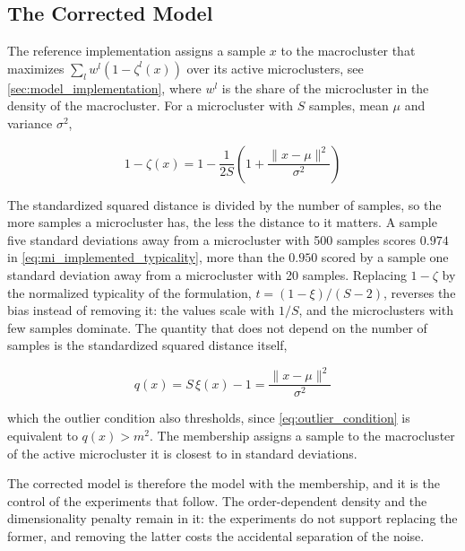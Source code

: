 \subsection{The Corrected Model}
\label{subsec:mi_corrected_model}

The reference implementation assigns a sample $x$ to the macrocluster that maximizes $\sum_{l} w^l \left(1 - \zeta^l(x)\right)$ over its active microclusters, see \cref{sec:model_implementation}, where $w^l$ is the share of the microcluster in the density of the macrocluster. For a microcluster with $S$ samples, mean $\mu$ and variance $\sigma^2$,

\begin{equation}
    1 - \zeta(x) = 1 - \frac{1}{2S} \left( 1 + \frac{\lVert x - \mu \rVert^2}{\sigma^2} \right)
    \label{eq:mi_implemented_typicality}
\end{equation}

The standardized squared distance is divided by the number of samples, so the more samples a microcluster has, the less the distance to it matters. A sample five standard deviations away from a microcluster with 500 samples scores $0.974$ in \cref{eq:mi_implemented_typicality}, more than the $0.950$ scored by a sample one standard deviation away from a microcluster with 20 samples. Replacing $1 - \zeta$ by the normalized typicality of the formulation, $t = (1 - \xi)/(S - 2)$, reverses the bias instead of removing it: the values scale with $1/S$, and the microclusters with few samples dominate. The quantity that does not depend on the number of samples is the standardized squared distance itself,

\begin{equation}
    q(x) = S\,\xi(x) - 1 = \frac{\lVert x - \mu \rVert^2}{\sigma^2}
    \label{eq:mi_standardized_distance}
\end{equation}

which the outlier condition also thresholds, since \cref{eq:outlier_condition} is equivalent to $q(x) > m^2$. The membership  assigns a sample to the macrocluster of the active microcluster it is closest to in standard deviations.

The corrected model is therefore the  model with the  membership, and it is the control of the experiments that follow. The order-dependent density and the dimensionality penalty remain in it: the experiments do not support replacing the former, and removing the latter costs the accidental separation of the noise.

